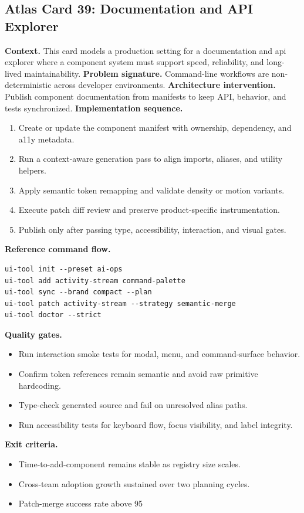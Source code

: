 \subsection*{Atlas Card 39: Documentation and API Explorer}
\textbf{Context.} This card models a production setting for a documentation and api explorer where a component system must support speed, reliability, and long-lived maintainability.
\textbf{Problem signature.} Command-line workflows are non-deterministic across developer environments.
\textbf{Architecture intervention.} Publish component documentation from manifests to keep API, behavior, and tests synchronized.
\textbf{Implementation sequence.}
\begin{enumerate}[leftmargin=*, itemsep=0.28em]
  \item Create or update the component manifest with ownership, dependency, and a11y metadata.
  \item Run a context-aware generation pass to align imports, aliases, and utility helpers.
  \item Apply semantic token remapping and validate density or motion variants.
  \item Execute patch diff review and preserve product-specific instrumentation.
  \item Publish only after passing type, accessibility, interaction, and visual gates.
\end{enumerate}
\textbf{Reference command flow.}
\begin{verbatim}
ui-tool init --preset ai-ops
ui-tool add activity-stream command-palette
ui-tool sync --brand compact --plan
ui-tool patch activity-stream --strategy semantic-merge
ui-tool doctor --strict
\end{verbatim}
\textbf{Quality gates.}
\begin{itemize}[leftmargin=*, itemsep=0.24em]
  \item Run interaction smoke tests for modal, menu, and command-surface behavior.
  \item Confirm token references remain semantic and avoid raw primitive hardcoding.
  \item Type-check generated source and fail on unresolved alias paths.
  \item Run accessibility tests for keyboard flow, focus visibility, and label integrity.
\end{itemize}
\textbf{Exit criteria.}
\begin{itemize}[leftmargin=*, itemsep=0.24em]
  \item Time-to-add-component remains stable as registry size scales.
  \item Cross-team adoption growth sustained over two planning cycles.
  \item Patch-merge success rate above 95%
\end{itemize}
\clearpage

